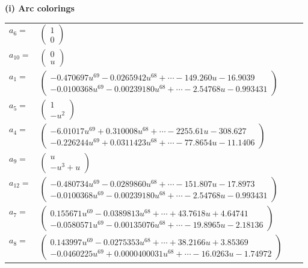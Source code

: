 \documentclass[1p]{elsarticle_modified}
\theoremstyle{definition}
\begin{document}
\flushleft \textbf{(i) Arc colorings}\\
\begin{tabular}{m{7pt} m{180pt} m{7pt} m{180pt} }
\flushright $a_{6}=$&$\begin{pmatrix}1\\0\end{pmatrix}$ \\
\flushright $a_{10}=$&$\begin{pmatrix}0\\u\end{pmatrix}$ \\
\flushright $a_{1}=$&$\begin{pmatrix}-0.470697 u^{69}-0.0265942 u^{68}+\cdots-149.260 u-16.9039\\-0.0100368 u^{69}-0.00239180 u^{68}+\cdots-2.54768 u-0.993431\end{pmatrix}$ \\
\flushright $a_{5}=$&$\begin{pmatrix}1\\- u^2\end{pmatrix}$ \\
\flushright $a_{4}=$&$\begin{pmatrix}-6.01017 u^{69}+0.310008 u^{68}+\cdots-2255.61 u-308.627\\-0.226244 u^{69}+0.0311423 u^{68}+\cdots-77.8654 u-11.1406\end{pmatrix}$ \\
\flushright $a_{9}=$&$\begin{pmatrix}u\\- u^3+u\end{pmatrix}$ \\
\flushright $a_{12}=$&$\begin{pmatrix}-0.480734 u^{69}-0.0289860 u^{68}+\cdots-151.807 u-17.8973\\-0.0100368 u^{69}-0.00239180 u^{68}+\cdots-2.54768 u-0.993431\end{pmatrix}$ \\
\flushright $a_{7}=$&$\begin{pmatrix}0.155671 u^{69}-0.0389813 u^{68}+\cdots+43.7618 u+4.64741\\-0.0580571 u^{69}-0.00135076 u^{68}+\cdots-19.8965 u-2.18136\end{pmatrix}$ \\
\flushright $a_{8}=$&$\begin{pmatrix}0.143997 u^{69}-0.0275353 u^{68}+\cdots+38.2166 u+3.85369\\-0.0460225 u^{69}+0.0000400031 u^{68}+\cdots-16.0263 u-1.74972\end{pmatrix}$ \\

\end{tabular}
\end{document}
